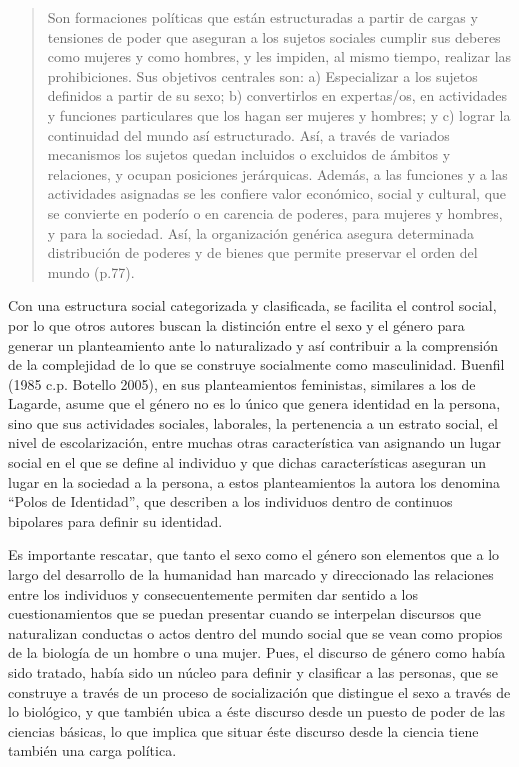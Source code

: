 \begin{quote}
    Son formaciones políticas que están estructuradas a partir de cargas y
    tensiones de poder que aseguran a los sujetos sociales cumplir sus deberes
    como mujeres y como hombres, y les impiden, al mismo tiempo, realizar
    las prohibiciones.
    Sus objetivos centrales son: a) Especializar a los sujetos definidos a partir de
    su sexo;
    b) convertirlos en expertas/os, en actividades y funciones particulares
    que los hagan ser mujeres y hombres;
    y c) lograr la continuidad del mundo así estructurado.
    Así, a través de variados mecanismos los sujetos quedan incluidos o excluidos de
    ámbitos y relaciones, y ocupan posiciones jerárquicas.
    Además, a las funciones y a las actividades asignadas se les confiere valor
    económico, social y cultural, que se convierte en poderío o en carencia de
    poderes, para mujeres y hombres, y para la sociedad.
    Así, la organización genérica asegura determinada distribución de poderes y de
    bienes que permite preservar el orden del mundo (p.77).
\end{quote}

Con una estructura social categorizada y clasificada, se facilita el control
social, por lo que otros autores buscan la distinción entre el sexo y el género
para generar un planteamiento ante lo naturalizado y así contribuir a la
comprensión de la complejidad de lo que se construye socialmente como
masculinidad.
Buenfil (1985 c.p. Botello 2005), en sus planteamientos feministas, similares
a los de Lagarde, asume que el género no es lo único que genera identidad en la
persona, sino que sus actividades sociales, laborales, la pertenencia a un
estrato social, el nivel de escolarización, entre muchas otras característica
van asignando un lugar social en el que se define al individuo y que dichas
características aseguran un lugar en la sociedad a la persona, a estos
planteamientos la autora los denomina “Polos de Identidad”, que describen a los
individuos dentro de continuos bipolares para definir su identidad.

Es importante rescatar, que tanto el sexo como el género son elementos que a lo
largo del desarrollo de la humanidad han marcado y direccionado las relaciones
entre los individuos y consecuentemente permiten dar sentido a los
cuestionamientos que se puedan presentar cuando se interpelan discursos que
naturalizan conductas o actos dentro del mundo social que se vean como propios
de la biología de un hombre o una mujer.
Pues, el discurso de género como había sido tratado, había sido un núcleo para
definir y clasificar a las personas, que se construye a través de un proceso de
socialización que distingue el sexo a través de lo biológico, y que también
ubica a éste discurso desde un puesto de poder de las ciencias básicas, lo que
implica que situar éste discurso desde la ciencia tiene también una carga
política.

